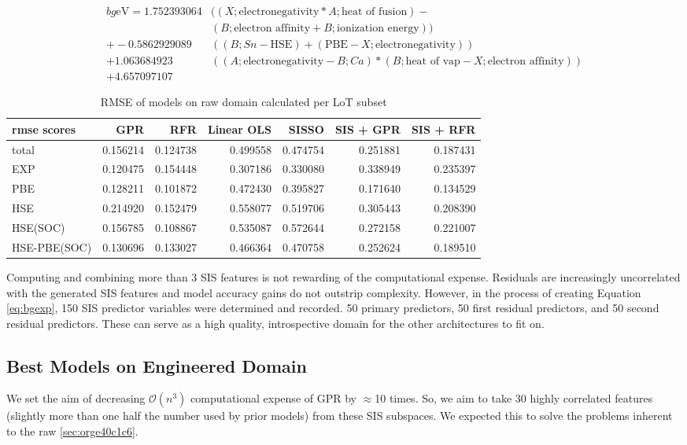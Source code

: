 \begin{align}
\label{eq:bgexp}
bg\si{\electronvolt} = 1.752393064 &((X;\mbox{electronegativity}*A;\mbox{heat of fusion})-\nonumber\\&(B;\mbox{electron affinity}+B;\mbox{ionization energy}))\nonumber\\+-0.5862929089 &((B;Sn-\mbox{HSE})+(\mbox{PBE}-X;\mbox{electronegativity}))\nonumber\\+1.063684923 &((A;\mbox{electronegativity}-B;Ca)*(B;\mbox{heat of vap}-X;\mbox{electron affinity}))\nonumber\\+4.657097107
\end{align}

\begin{table}[htbp]
\caption{\label{tbl:LoTscores} RMSE of models on raw domain calculated per LoT subset}
\centering
\begin{tabular}{lrrrrrr}
rmse scores & GPR & RFR & Linear OLS & SISSO & SIS + GPR & SIS + RFR\\[0pt]
\hline
total & 0.156214 & 0.124738 & 0.499558 & 0.474754 & 0.251881 & 0.187431\\[0pt]
EXP & 0.120475 & 0.154448 & 0.307186 & 0.330080 & 0.338949 & 0.235397\\[0pt]
PBE & 0.128211 & 0.101872 & 0.472430 & 0.395827 & 0.171640 & 0.134529\\[0pt]
HSE & 0.214920 & 0.152479 & 0.558077 & 0.519706 & 0.305443 & 0.208390\\[0pt]
HSE(SOC) & 0.156785 & 0.108867 & 0.535087 & 0.572644 & 0.272158 & 0.221007\\[0pt]
HSE-PBE(SOC) & 0.130696 & 0.133027 & 0.466364 & 0.470758 & 0.252624 & 0.189510\\[0pt]
\end{tabular}
\end{table}

Computing and combining more than 3 SIS features is not rewarding of the computational expense.
Residuals are increasingly uncorrelated with the generated SIS features and model accuracy gains do not outstrip complexity.
However, in the process of creating Equation \ref{eq:bgexp}, 150 SIS predictor variables were determined and recorded.
50 primary predictors, 50 first residual predictors, and 50 second residual predictors.
These can serve as a high quality, introspective domain for the other architectures to fit on.

\subsection{Best Models on Engineered Domain}
\label{sec:org8867d46}
We set the aim of decreasing \(\mathcal{O}(n^3)\) computational expense of GPR by \(\approx\)10 times.
So, we aim to take 30 highly correlated features (slightly more than one half the number used by prior models) from these SIS subspaces.
We expected this to solve the problems inherent to the raw \ref{sec:orge40c1c6}.

